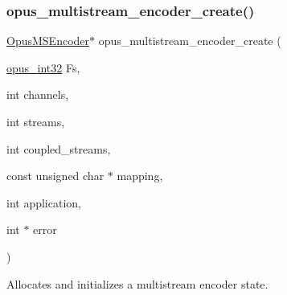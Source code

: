 \subsubsection{\texorpdfstring{opus\+\_\+multistream\+\_\+encoder\+\_\+create()}{opus\_multistream\_encoder\_create()}}
{\footnotesize\ttfamily \hyperlink{group__opus__multistream_gae5826674d142fc873ebc1d781c507dd7}{Opus\+M\+S\+Encoder}$\ast$ opus\+\_\+multistream\+\_\+encoder\+\_\+create (\begin{DoxyParamCaption}\item[{\hyperlink{opus__types_8h_aa4d309d6f80b99dbabebc8f98879ab9a}{opus\+\_\+int32}}]{Fs,  }\item[{int}]{channels,  }\item[{int}]{streams,  }\item[{int}]{coupled\+\_\+streams,  }\item[{const unsigned char $\ast$}]{mapping,  }\item[{int}]{application,  }\item[{int $\ast$}]{error }\end{DoxyParamCaption})}



Allocates and initializes a multistream encoder state. 

